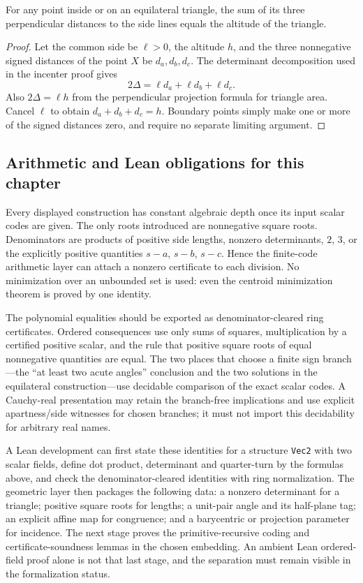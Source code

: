 \begin{theorem}
\label{tri:viviani}
For any point inside or on an equilateral triangle, the sum of its three
perpendicular distances to the side lines equals the altitude of the
triangle.
\end{theorem}
\begin{proof}
Let the common side be $\ell>0$, the altitude $h$, and the three
nonnegative signed distances of the point $X$ be $d_a,d_b,d_c$.
The determinant decomposition used in the incenter proof gives
\[
 2\Delta=\ell d_a+\ell d_b+\ell d_c.
\]
Also $2\Delta=\ell h$ from the perpendicular projection formula for
triangle area.  Cancel $\ell$ to obtain $d_a+d_b+d_c=h$.
Boundary points simply make one or more of the signed distances zero,
and require no separate limiting argument.
\end{proof}

\subsection{Arithmetic and Lean obligations for this chapter}

Every displayed construction has constant algebraic depth once its input
scalar codes are given.  The only roots introduced are nonnegative square
roots.  Denominators are products of positive side lengths, nonzero
determinants, $2$, $3$, or the explicitly positive quantities $s-a$, $s-b$,
$s-c$.  Hence the finite-code arithmetic layer can attach a nonzero
certificate to each division.  No minimization over an unbounded set is
used: even the centroid minimization theorem is proved by one identity.

The polynomial equalities should be exported as denominator-cleared ring
certificates.  Ordered consequences use only sums of squares, multiplication
by a certified positive scalar, and the rule that positive square roots of
equal nonnegative quantities are equal.  The two places that choose a
finite sign branch---the ``at least two acute angles'' conclusion and the
two solutions in the equilateral construction---use decidable comparison
of the exact scalar codes.  A Cauchy-real presentation may retain the
branch-free implications and use explicit apartness/side witnesses for
chosen branches; it must not import this decidability for arbitrary real
names.

A Lean development can first state these identities for a structure
\texttt{Vec2} with two scalar fields, define dot product, determinant and
quarter-turn by the formulas above, and check the denominator-cleared
identities with ring normalization.  The geometric layer then packages
the following data: a nonzero determinant for a triangle; positive square
roots for lengths; a unit-pair angle and its half-plane tag; an explicit
affine map for congruence; and a barycentric or projection parameter for
incidence.  The next stage proves the primitive-recursive coding and
certificate-soundness lemmas in the chosen \ipra{} embedding.  An ambient
Lean ordered-field proof alone is not that last stage, and the separation
must remain visible in the formalization status.
